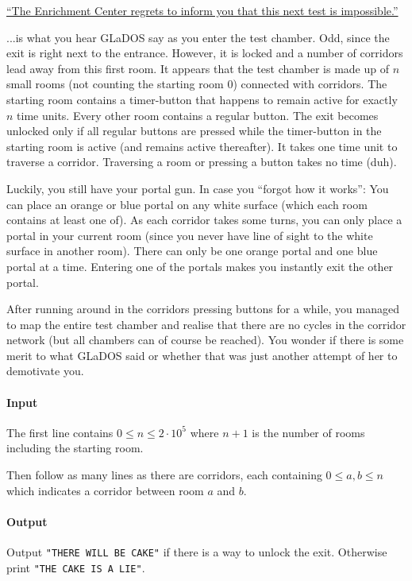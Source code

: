 




\href{https://i1.theportalwiki.net/img/d/d0/GLaDOS_05_part1_entry-1.wav}{``The Enrichment Center regrets to inform you that this next test is impossible.''}

...is what you hear GLaDOS say as you enter the test chamber. Odd, since the exit is right next to the entrance. However, it is locked and a number of corridors lead away from this first room. It appears that the test chamber is made up of $n$ small rooms (not counting the starting room $0$) connected with corridors. The starting room contains a timer-button that happens to remain active for exactly $n$ time units. Every other room contains a regular button. The exit becomes unlocked only if all regular buttons are pressed while the timer-button in the starting room is active (and remains active thereafter). It takes one time unit to traverse a corridor. Traversing a room or pressing a button takes no time (duh).

Luckily, you still have your portal gun. In case you ``forgot how it works'': You can place an orange or blue portal on any white surface (which each room contains at least one of). As each corridor takes some turns, you can only place a portal in your current room (since you never have line of sight to the white surface in another room). There can only be one orange portal and one blue portal at a time. Entering one of the portals makes you instantly exit the other portal.

After running around in the corridors pressing buttons for a while, you managed to map the entire test chamber and realise that there are no cycles in the corridor network (but all chambers can of course be reached). You wonder if there is some merit to what GLaDOS said or whether that was just another attempt of her to demotivate you.

\paragraph*{Input}

The first line contains $0\leq n\leq 2\cdot 10^5$ where $n+1$ is the number of rooms including the starting room.

Then follow as many lines as there are corridors, each containing $0 \leq a,b \leq n$ which indicates a corridor between room $a$ and $b$.

\paragraph*{Output}

Output \texttt{"THERE WILL BE CAKE"} if there is a way to unlock the exit. Otherwise print \texttt{"THE CAKE IS A LIE"}.

\begin{samples}
\end{samples}


